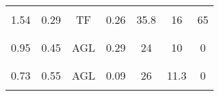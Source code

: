 \begin{table}
\begin{center}
\begin{tabular}{|l|cccccc|}
& & & & & & \\
1.54 & 0.29 &TF  & 0.26 & 35.8 & 16  & 65 \\
& & & & & & \\
\hline
\hline
& & & & & & \\
0.95 & 0.45 & AGL& 0.29 & 24 & 10 & 0 \\
& & & & & & \\
\hline
\hline
& & & & & & \\
0.73\cite{iye82} & 0.55 & AGL & 0.09 & 26 & 11.3 & 0 \\
& & & & & & \\
\hline
\end{tabular}
\end{center}
\end{table}

